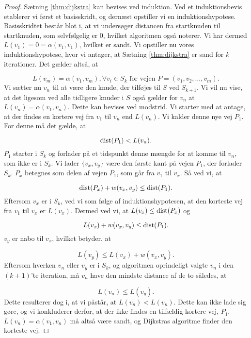 \begin{proof}
Sætning \ref{thm:dijkstra} kan bevises ved induktion. Ved et induktionsbevis etablerer vi først et basisskridt, og dernæst opstiller vi en induktionshypotese. Basisskridtet består blot i, at vi undersøger distancen fra startknuden til startknuden, som selvfølgelig er 0, hvilket algoritmen også noterer. Vi har dermed $L(v_1)=0= \alpha(v_1,v_1)$, hvilket er sandt.
Vi opstiller nu vores induktionshypotese, hvor vi antager, at Sætning \ref{thm:dijkstra} er sand for $k$ iterationer. Det gælder altså, at

\begin{equation}
L(v_m) = \alpha(v_1,v_m), \forall v_i \in S_k \textrm{ for vejen } P = (v_1, v_2, \dotsc, v_m).
\end{equation}
Vi sætter nu $v_{n}$ til at være den knude, der tilføjes til $S$ ved $S_{k+1}$. Vi vil nu vise, at det ligesom ved alle tidligere knuder i $S$ også gælder for $v_{n}$ at $L(v_n)=\alpha(v_1,v_n)$. Dette kan bevises ved modstrid. Vi starter med at antage, at der findes en kortere vej fra $v_1$ til $v_n$ end $L(v_n)$. Vi kalder denne nye vej $P_1$. For denne må det gælde, at

\begin{equation}
\textrm{dist}(P_1)<L(v_n).
\end{equation}
$P_1$ starter i $S_k$ og forlader på et tidspunkt denne mængde for at komme til $v_n$, som ikke er i $S_k$. Vi lader $\{v_x,v_y\}$ være den første kant på vejen $P_1$, der forlader $S_k$. $P_x$ betegnes som delen af vejen $P_1$, som går fra $v_1$ til $v_x$. Så ved vi, at

\begin{equation}
\textrm{dist}(P_x)+w(v_x,v_y) \leq \textrm{dist}(P_1).
\end{equation}
Eftersom $v_x$ er i $S_k$, ved vi som følge af induktionshypotesen, at den korteste vej fra $v_1$ til $v_x$ er $L(v_x)$. Dermed ved vi, at $L(v_x) \leq \textrm{dist}(P_x)$ og

\begin{equation}
L(v_x) + w(v_x,v_y) \leq \textrm{dist}(P_1).
\end{equation}
$v_y$ er nabo til $v_x$, hvilket betyder, at

\begin{equation}
L(v_y) \leq L(v_x) + w(v_x,v_y).
\end{equation}
Eftersom hverken $v_n$ eller $v_y$ er i $S_k$, og algoritmen oprindeligt valgte $v_n$ i den $(k+1)$'te iteration, må $v_n$ have den mindste distance af de to således, at

\begin{equation}
L(v_n) \leq L(v_y).
\end{equation}
Dette resulterer dog i, at vi påstår, at $L(v_n) < L(v_n)$. Dette kan ikke lade sig gøre, og vi konkluderer derfor, at der ikke findes en tilfældig kortere vej, $P_1$. $L(v_n)=\alpha(v_1,v_n)$ må altså være sandt, og Dijkstras algoritme finder den korteste vej.
\end{proof}
